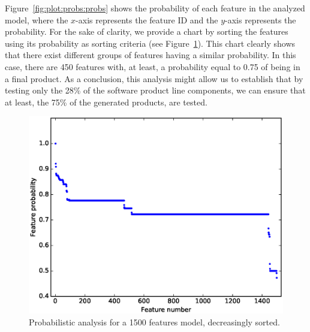 Figure~\ref{fig:plot:probs:probs} shows the probability of each feature in the analyzed model, where the $x$-axis
represents the feature ID and the $y$-axis represents the probability. For the sake of clarity, we provide a chart by sorting the features using its probability as sorting criteria (see Figure~\ref{fig:plot:probs:probs:sorted}).
This chart clearly shows that there exist different groups of features having a similar probability.
%
In this case, there are 450 features with, at least, a probability equal to 0.75 of being in a final product. As a conclusion,
this analysis might allow us to establish that by testing only the 28\% of the software product line components, we can ensure that
at least, the 75\% of the generated products, are tested.

\begin{figure}[h]
        \centering
        \linefigure
        \includegraphics[width=0.8\hsize,angle=0]{plot_probs_probs_sorted.eps}
        \linefigure
        \caption{Probabilistic analysis for a 1500 features model, decreasingly sorted.}\label{fig:plot:probs:probs:sorted}
\end{figure}


